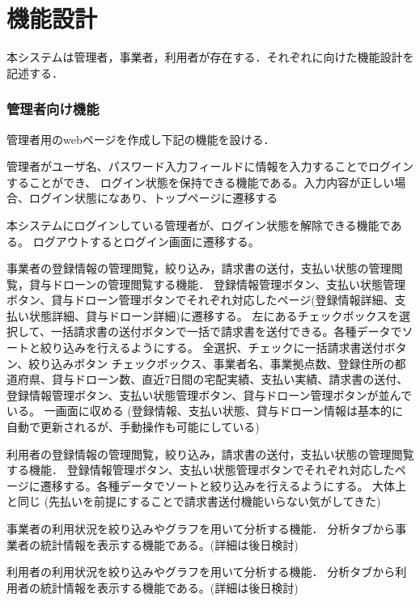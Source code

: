 \documentclass[a4paper, titlepage]{jsarticle}
\begin{document}
\section{機能設計}
本システムは管理者，事業者，利用者が存在する．それぞれに向けた機能設計を記述する．
\subsubsection{管理者向け機能}
管理者用のwebページを作成し下記の機能を設ける．
\begin{description}[labelwidth=\linewidth]
  \setlength{\leftskip}{1em}
  \item [ログイン機能] 管理者がユーザ名、パスワード入力フィールドに情報を入力することでログインすることができ、
  ログイン状態を保持できる機能である。入力内容が正しい場合、ログイン状態になあり、トップページに遷移する
  \item [ログアウト機能] 本システムにログインしている管理者が、ログイン状態を解除できる機能である。
  ログアウトするとログイン画面に遷移する。
  \item [事業者管理機能]事業者の登録情報の管理閲覧，絞り込み，請求書の送付，支払い状態の管理閲覧，貸与ドローンの管理閲覧する機能．
  登録情報管理ボタン、支払い状態管理ボタン、貸与ドローン管理ボタンでそれぞれ対応したページ(登録情報詳細、支払い状態詳細、貸与ドローン詳細)に遷移する。
  左にあるチェックボックスを選択して、一括請求書の送付ボタンで一括で請求書を送付できる。各種データでソートと絞り込みを行えるようにする。
  全選択、チェックに一括請求書送付ボタン、絞り込みボタン
  チェックボックス、事業者名、事業拠点数、登録住所の都道府県、貸与ドローン数、直近7日間の宅配実績、支払い実績、請求書の送付、登録情報管理ボタン、支払い状態管理ボタン、貸与ドローン管理ボタンが並んでいる。
  一画面に収める
  (登録情報、支払い状態、貸与ドローン情報は基本的に自動で更新されるが、手動操作も可能にしている)

  \item [利用者管理機能]利用者の登録情報の管理閲覧，絞り込み，請求書の送付，支払い状態の管理閲覧する機能．
  登録情報管理ボタン、支払い状態管理ボタンでそれぞれ対応したページに遷移する。各種データでソートと絞り込みを行えるようにする。
  大体上と同じ
  (先払いを前提にすることで請求書送付機能いらない気がしてきた)

  \item [事業者情報分析機能]事業者の利用状況を絞り込みやグラフを用いて分析する機能．
  分析タブから事業者の統計情報を表示する機能である。(詳細は後日検討)

  \item [利用者情報分析機能]利用者の利用状況を絞り込みやグラフを用いて分析する機能．
  分析タブから利用者の統計情報を表示する機能である。(詳細は後日検討)


\end{description}
\end{document}
